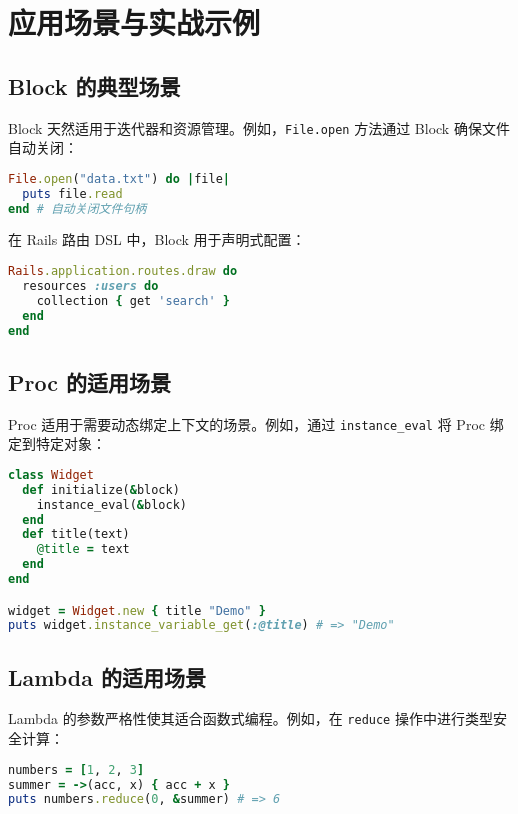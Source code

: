 \chapter{应用场景与实战示例}
\section{Block 的典型场景}
Block 天然适用于迭代器和资源管理。例如，\verb!File.open! 方法通过 Block 确保文件自动关闭：\par
\begin{lstlisting}[language=ruby]
File.open("data.txt") do |file|
  puts file.read
end # 自动关闭文件句柄
\end{lstlisting}
在 Rails 路由 DSL 中，Block 用于声明式配置：\par
\begin{lstlisting}[language=ruby]
Rails.application.routes.draw do
  resources :users do
    collection { get 'search' }
  end
end
\end{lstlisting}
\section{Proc 的适用场景}
Proc 适用于需要动态绑定上下文的场景。例如，通过 \verb!instance_eval! 将 Proc 绑定到特定对象：\par
\begin{lstlisting}[language=ruby]
class Widget
  def initialize(&block)
    instance_eval(&block)
  end
  def title(text)
    @title = text
  end
end

widget = Widget.new { title "Demo" }
puts widget.instance_variable_get(:@title) # => "Demo"
\end{lstlisting}
\section{Lambda 的适用场景}
Lambda 的参数严格性使其适合函数式编程。例如，在 \verb!reduce! 操作中进行类型安全计算：\par
\begin{lstlisting}[language=ruby]
numbers = [1, 2, 3]
summer = ->(acc, x) { acc + x }
puts numbers.reduce(0, &summer) # => 6
\end{lstlisting}
